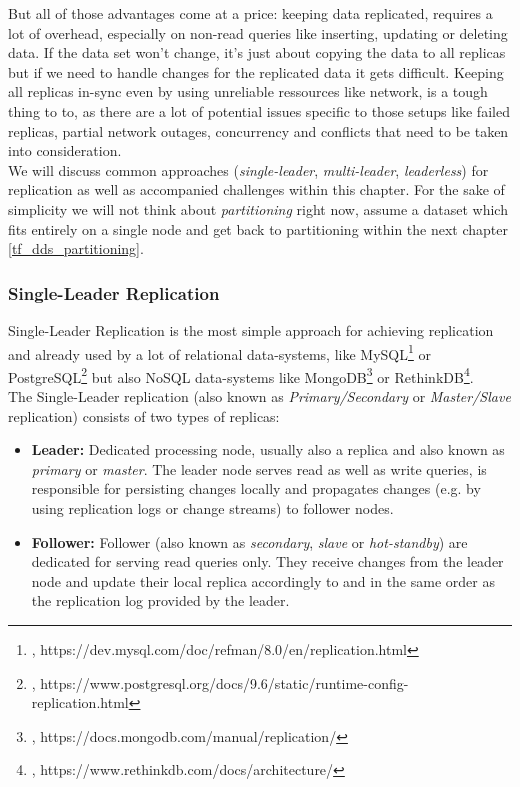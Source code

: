 {But all of those advantages come at a price: keeping data replicated, requires a lot of overhead, especially on non-read queries like inserting, updating or deleting data. If the data set won't change, it's just about copying the data to all replicas but if we need to handle changes for the replicated data it gets difficult. Keeping all replicas in-sync even by using unreliable ressources like network, is a tough thing to to, as there are a lot of potential issues specific to those setups like failed replicas, partial network outages, concurrency and conflicts that need to be taken into consideration.  \\
We will discuss common approaches (\textit{single-leader}, \textit{multi-leader}, \textit{leaderless}) for replication as well as accompanied challenges within this chapter. For the sake of simplicity we will not think about \textit{partitioning} right now, assume a dataset which fits entirely on a single node and get back to partitioning within the next chapter \ref{tf_dds_partitioning}.

\subsubsection{Single-Leader Replication}
\label{tf_dds_replication_single_leader}
Single-Leader Replication is the most simple approach for achieving replication and already used by a lot of relational data-systems, like MySQL\footnote{\cite{MYSQLREP}, https://dev.mysql.com/doc/refman/8.0/en/replication.html} or PostgreSQL\footnote{\cite{PSQLREP}, https://www.postgresql.org/docs/9.6/static/runtime-config-replication.html} but also NoSQL data-systems like MongoDB\footnote{\cite{MDBREP}, https://docs.mongodb.com/manual/replication/} or RethinkDB\footnote{\cite{RDBREP}, https://www.rethinkdb.com/docs/architecture/}.\\
The Single-Leader replication (also known as \textit{Primary/Secondary} or \textit{Master/Slave} replication) consists of two types of replicas:\\
\begin{itemize}
\item \textbf{Leader:} Dedicated processing node, usually also a replica and also known as \textit{primary} or \textit{master}. The leader node serves read as well as write queries, is responsible for persisting changes locally and propagates changes (e.g. by using replication logs or change streams) to follower nodes.
\item \textbf{Follower:} Follower (also known as \textit{secondary}, \textit{slave} or \textit{hot-standby}) are dedicated for serving read queries only. They receive changes from the leader node and update their local replica accordingly to and in the same order as the replication log provided by the leader.\\
\end{itemize}

}
